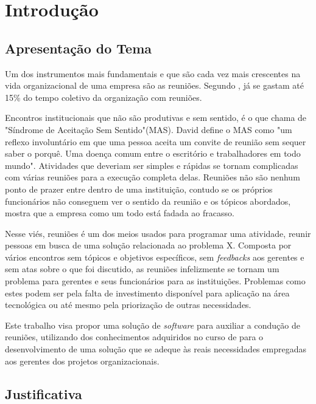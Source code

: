 \chapter[Introdução]{Introdução}
\label{cp:introducao}

\section{Apresentação do Tema}
\label{sec:apresentacao}

Um dos instrumentos mais fundamentais e que são cada vez mais crescentes na vida organizacional de uma empresa são as reuniões. Segundo \cite{allen2016}, já se gastam até 15\% do tempo coletivo da organização com reuniões. 

Encontros institucionais que não são produtivas e sem sentido, é o que \cite{davidgrady} chama de "Síndrome de Aceitação Sem Sentido"(MAS). David define o MAS como "um reflexo involuntário em que uma pessoa aceita um convite de reunião sem sequer saber o porquê. Uma doença comum entre o escritório e trabalhadores em todo mundo". Atividades que deveriam ser simples e rápidas se tornam complicadas com várias reuniões para a execução completa delas. Reuniões não são nenhum ponto de prazer entre dentro de uma instituição, contudo se os próprios funcionários não conseguem ver o sentido da reunião e os tópicos abordados, mostra que a empresa como um todo está fadada ao fracasso. 

Nesse viés, reuniões é um dos meios usados para programar uma atividade, reunir pessoas em busca de uma solução relacionada ao problema X. Composta por vários encontros sem tópicos e objetivos específicos, sem \textit{feedbacks} aos gerentes e sem atas sobre o que foi discutido, as reuniões infelizmente se tornam um problema para gerentes e seus funcionários para as instituições. Problemas como estes podem ser pela falta de investimento disponível para aplicação na área tecnológica ou até mesmo pela priorização de outras necessidades.

Este trabalho visa propor uma solução de \textit{software} para auxiliar a condução de reuniões, utilizando dos conhecimentos adquiridos no curso de \imprimircurso para o desenvolvimento de uma solução que se adeque às reais necessidades empregadas aos gerentes dos projetos organizacionais. 

\section{Justificativa}
\label{sec:justificativa}

